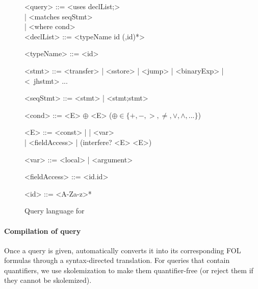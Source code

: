 \begin{figure}[hbt!]
  \setlength{\grammarparsep}{0em}
    \begin{grammar}
    <query> ::= <uses declList;>  \\
    | <matches {seqStmt}> \\
    | <where cond> \\
    
    <declList> ::= <typeName id (,id)*>
    
    <typeName> ::= <id> 
    
    <stmt> ::= <transfer> | <sstore> | <jump> | <binaryExp> | <~jhstmt> ...
    
    <seqStmt> ::= <stmt> | <stmt;stmt>  
    
    <cond> ::=  <E> $\oplus$ <E> 
 ($\oplus\in\{+, -, >, \neq, \vee, \wedge, ...\}$)
 
   <E> ::= <const> |  | <var> \\
   | <fieldAccess> | (interfere? <E> <E>)
   
   <var> ::= <local> | <argument>
   
   <fieldAccess> ::= <id.id>
   
   <id> ::= <A-Za-z>*

    \end{grammar}
  \caption{Query language for \toolname}
  \label{fig:query-lang}
  \end{figure}

\paragraph{Compilation of query} 
Once a query is given, \toolname automatically converts it into its corresponding FOL formulas through a syntax-directed translation. For queries that contain quantifiers, we use skolemization to make them quantifier-free  (or reject them if they cannot be skolemized).


